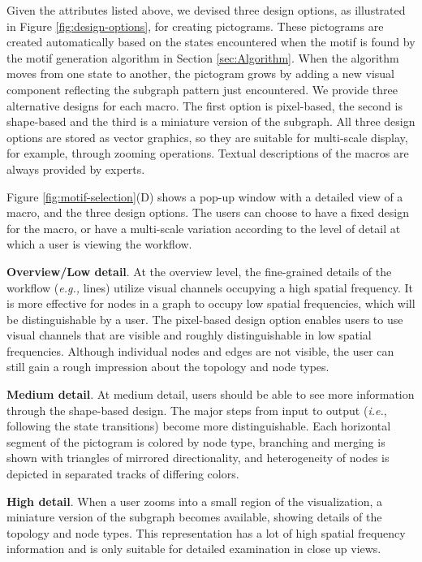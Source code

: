 \vspace{-1mm}
Given the attributes listed above, we devised three design options, as illustrated in Figure \ref{fig:design-options}, for creating pictograms.
These pictograms are created automatically based on the states encountered when the motif is found by the motif generation algorithm in Section \ref{sec:Algorithm}.
When the algorithm moves from one state to another, the pictogram grows by adding a new visual component reflecting the subgraph pattern just encountered.
We provide three alternative designs for each macro.
The first option is pixel-based, the second is shape-based and the third is a miniature version of the subgraph.
All three design options are stored as vector graphics, so they are suitable for multi-scale display, for example, through zooming operations.
Textual descriptions of the macros are always provided by experts.


Figure \ref{fig:motif-selection}(D) shows a pop-up window with a detailed view of a macro, and the three design options.
The users can choose to have a fixed design for the macro, or have a multi-scale variation according to the level of detail at which a user is viewing the workflow.

\noindent\textbf{Overview/Low detail}. At the overview level, the fine-grained details of the workflow (\emph{e.g.,} lines) utilize visual channels occupying a high spatial frequency.
It is more effective for nodes in a graph to occupy low spatial frequencies, which will be distinguishable by a user.
The pixel-based design option enables users to use visual channels that are visible and roughly distinguishable in low spatial frequencies.
Although individual nodes and edges are not visible, the user can still gain a rough impression about the topology and node types. 

\noindent\textbf{Medium detail}. At medium detail, users should be able to see more information through the shape-based design.
The major steps from input to output (\emph{i.e.}, following the state transitions) become more distinguishable.
Each horizontal segment of the pictogram is colored by node type, branching and merging is shown with triangles of mirrored directionality, and heterogeneity of nodes is depicted in separated tracks of differing colors. 

\noindent \textbf{High detail}. When a user zooms into a small region of the visualization, a miniature version of the subgraph becomes available, showing details of the topology and node types. This representation has a lot of high spatial frequency information and is only suitable for detailed examination in close up views.

